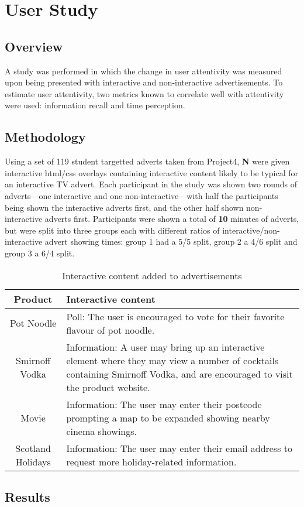 \section{User Study}
	\subsection{Overview}
	A study was performed in which the change in user attentivity was measured upon being presented with interactive and non-interactive advertisements. To estimate user attentivity, two metrics known to correlate well with attentivity were used: information recall\cite{} and time perception\cite{yahoo-intrusive-advertising}.

	\subsection{Methodology}
	Using a set of 119 student targetted adverts taken from Project4, \large{\textbf{N}} were given interactive html/css overlays containing interactive content likely to be typical for an interactive TV advert. Each participant in the study was shown two rounds of adverts---one interactive and one non-interactive---with half the participants being shown the interactive adverts first, and the other half shown non-interactive adverts first. Participants were shown a total of \large{\textbf{10}} minutes of adverts, but were split into three groups each with different ratios of interactive/non-interactive advert showing times: group 1 had a 5/5 split, group 2 a 4/6 split and group 3 a 6/4 split. 

	\begin{table}[hb]
		\centering
		\begin{tabular}{ c l }
			\toprule
			\bf Product & \bf Interactive content \\
			\midrule
			Pot Noodle & Poll: The user is encouraged to vote for their favorite flavour of pot noodle. \\
			Smirnoff Vodka & Information: A user may bring up an interactive element where they may view a number of cocktails containing Smirnoff Vodka, and are encouraged to visit the product website. \\
			Movie & Information: The user may enter their postcode prompting a map to be expanded showing nearby cinema showings. \\
			Scotland Holidays & Information: The user may enter their email address to request more holiday-related information. \\
			\bottomrule
		\end{tabular}
		\caption{Interactive content added to advertisements}
		\label{tab:interactive_content}
	\end{table}

	

	\subsection{Results}
